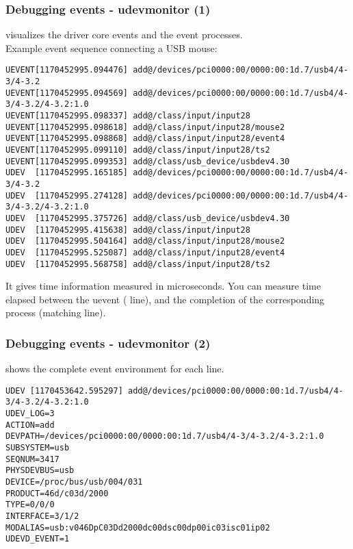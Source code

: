\begin{frame}[fragile]
  \frametitle{Debugging events - udevmonitor (1)}
   visualizes the driver core events and the  event processes.\\
  Example event sequence connecting a USB mouse:
  \begin{block}{}
\tiny
\begin{verbatim}
UEVENT[1170452995.094476] add@/devices/pci0000:00/0000:00:1d.7/usb4/4-3/4-3.2
UEVENT[1170452995.094569] add@/devices/pci0000:00/0000:00:1d.7/usb4/4-3/4-3.2/4-3.2:1.0
UEVENT[1170452995.098337] add@/class/input/input28
UEVENT[1170452995.098618] add@/class/input/input28/mouse2
UEVENT[1170452995.098868] add@/class/input/input28/event4
UEVENT[1170452995.099110] add@/class/input/input28/ts2
UEVENT[1170452995.099353] add@/class/usb_device/usbdev4.30
UDEV  [1170452995.165185] add@/devices/pci0000:00/0000:00:1d.7/usb4/4-3/4-3.2
UDEV  [1170452995.274128] add@/devices/pci0000:00/0000:00:1d.7/usb4/4-3/4-3.2/4-3.2:1.0
UDEV  [1170452995.375726] add@/class/usb_device/usbdev4.30
UDEV  [1170452995.415638] add@/class/input/input28
UDEV  [1170452995.504164] add@/class/input/input28/mouse2
UDEV  [1170452995.525087] add@/class/input/input28/event4
UDEV  [1170452995.568758] add@/class/input/input28/ts2
\end{verbatim}
\end{block}
It gives time information measured in microseconds. You can measure
time elapsed between the uevent ( line), and the completion of
the corresponding  process (matching  line).
\end{frame}

\begin{frame}[fragile]
\frametitle{Debugging events - udevmonitor (2)}
 shows the complete event environment for each line.
\begin{block}{}
\tiny
\begin{verbatim}
UDEV [1170453642.595297] add@/devices/pci0000:00/0000:00:1d.7/usb4/4-3/4-3.2/4-3.2:1.0
UDEV_LOG=3
ACTION=add
DEVPATH=/devices/pci0000:00/0000:00:1d.7/usb4/4-3/4-3.2/4-3.2:1.0
SUBSYSTEM=usb
SEQNUM=3417
PHYSDEVBUS=usb
DEVICE=/proc/bus/usb/004/031
PRODUCT=46d/c03d/2000
TYPE=0/0/0
INTERFACE=3/1/2
MODALIAS=usb:v046DpC03Dd2000dc00dsc00dp00ic03isc01ip02
UDEVD_EVENT=1
\end{verbatim}
\end{block}
\end{frame}

